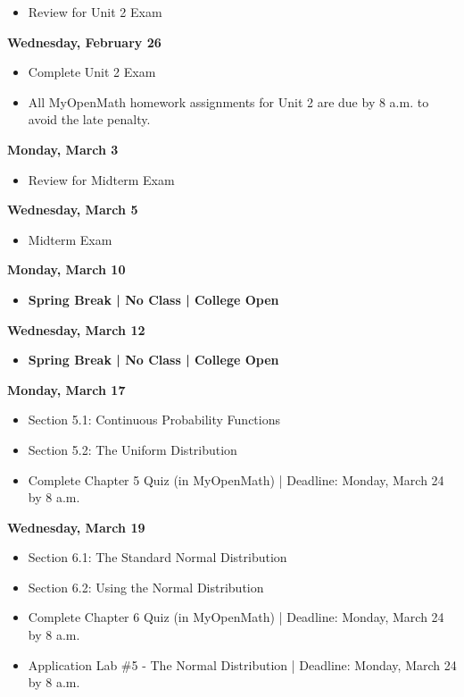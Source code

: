 \documentclass[11pt]{article}
\begin{document}
\begin{itemize}
\item Review for Unit 2 Exam
\end{itemize}

\textbf{Wednesday, February 26}

\begin{itemize}
\item Complete Unit 2 Exam
\item All MyOpenMath homework assignments for Unit 2 are due by 8 a.m. to avoid the late penalty.
\end{itemize}

\textbf{Monday, March 3}

\begin{itemize}
\item Review for Midterm Exam
\end{itemize}

\textbf{Wednesday, March 5}

\begin{itemize}
\item Midterm Exam
\end{itemize}

\textbf{Monday, March 10}

\begin{itemize}
\item \textbf{Spring Break | No Class | College Open}
\end{itemize}

\textbf{Wednesday, March 12}

\begin{itemize}
\item \textbf{Spring Break | No Class | College Open}
\end{itemize}

\textbf{Monday, March 17}

\begin{itemize}
\item Section 5.1: Continuous Probability Functions
\item Section 5.2: The Uniform Distribution
\item Complete Chapter 5 Quiz (in MyOpenMath) | Deadline: Monday, March 24 by 8 a.m.
\end{itemize}

\textbf{Wednesday, March 19}

\begin{itemize}
\item Section 6.1: The Standard Normal Distribution
\item Section 6.2: Using the Normal Distribution
\item Complete Chapter 6 Quiz (in MyOpenMath) | Deadline: Monday, March 24 by 8 a.m.
\item Application Lab \#5 - The Normal Distribution | Deadline: Monday, March 24 by 8 a.m.
\end{itemize}
\end{document}
